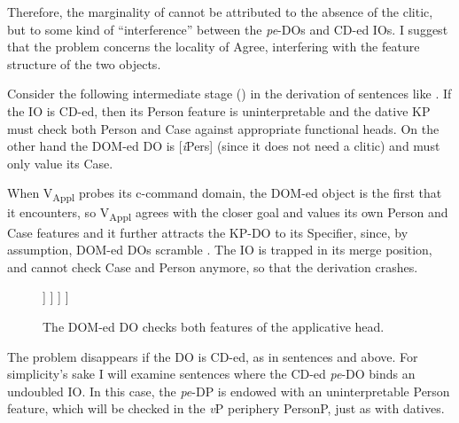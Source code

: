 \documentclass[output=paper,colorlinks,citecolor=brown,nonflat]{langsci/langscibook}
\begin{document}
Therefore, the marginality of  cannot be attributed to the absence of the clitic, but to some kind of “interference” between the \textit{pe}{}-DOs and CD-ed IOs. I suggest that the problem concerns the locality of Agree, interfering with the feature structure of the two objects.

Consider the following intermediate stage () in the derivation of sentences like . If the IO is CD-ed, then its Person feature is uninterpretable and the dative KP must check both Person and Case against appropriate functional heads. On the other hand the DOM-ed DO is [\textit{i}Pers] (since it does not need a clitic) and must only value its Case.

When V\textsubscript{Appl} probes its c-command domain, the DOM-ed object is the first that it encounters, so V\textsubscript{Appl} agrees with the closer goal and values its own Person and Case features and it further attracts the KP-DO to its Specifier, since, by assumption, DOM-ed DOs scramble \citep{López2012}. The IO is trapped in its merge position, and cannot check Case and Person anymore, so that the derivation crashes.

  \begin{figure}%
	\begin{forest}
		[\textit{v}P
			[\textit{v}
			]
			[V\textsubscript{Appl}P
				[V\textsubscript{Appl}\\
					\textbf{{[}{\textit{u}}{Pers}{]}}\\
					{[}\textit{u}Case:\textsc{acc}{]}
				]
				[VP
					[KP\textsubscript{DO}\\
						\textbf{{[}{\textit{i}}{Pers}{]}}\\
                                                {[}\textit{u}Case:\textsc{acc}{]}
					]
					[V'
						[V]
						[KP\textsubscript{do}\\
							\textbf{{[}{\textit{u}}{Pers}{]}}\\
							{[}\textit{u}Case:\textsc{dat}{]}
						]
					]
				]
			]
		]
	\end{forest}
	\caption{\label{fig:cornilescu:12} The DOM-ed DO checks both features of the applicative head.}
\end{figure}



The problem disappears if the DO is CD-ed, as in sentences  and  above. For simplicity’s sake I will examine sentences where the CD-ed \textit{pe}-DO binds an undoubled IO. In this case, the \textit{pe}-DP is endowed with an uninterpretable Person feature, which will be checked in the \textit{v}P periphery PersonP, just as with datives.
\end{document}
